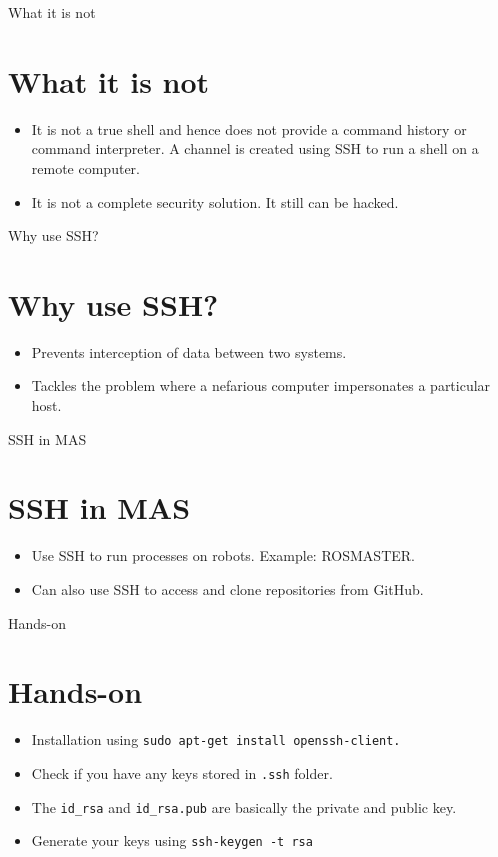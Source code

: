 \documentclass{beamer}
\begin{document}
\begin{frame}{What it is not}
\section{What it is not}
\begin{itemize}
\item {
It is not a true shell and hence does not provide a command history or command interpreter. A channel is created using SSH to run a shell on a remote computer.
}
\item {   
It is not a complete security solution. It still can be hacked.
}
\end{itemize}
\end{frame}

\begin{frame}{Why use SSH?}{}
\section{Why use SSH?}
\begin{itemize}
\item {
	Prevents interception of data between two systems.
}
\item {Tackles the problem where a nefarious computer impersonates a particular host.}
\end{itemize}
\end{frame}	

\begin{frame}{SSH in MAS}
\section{SSH in MAS}
\begin{itemize} 
	\item Use SSH to run processes on robots. Example: ROSMASTER.
	\item Can also use SSH to access and clone repositories from GitHub.
\end{itemize}
\end{frame}	

\begin{frame}{Hands-on}
	\section{Hands-on}
	\begin{itemize}
		\item Installation using \texttt{sudo apt-get install openssh-client.}
		\item Check if you have any keys stored in \texttt{.ssh} folder.
		\item The \texttt{id\_rsa} and \texttt{id\_rsa.pub} are basically the private and public key.
		\item Generate your keys using \texttt{ssh-keygen -t rsa}
	\end{itemize}
\end{frame}
\end{document}
